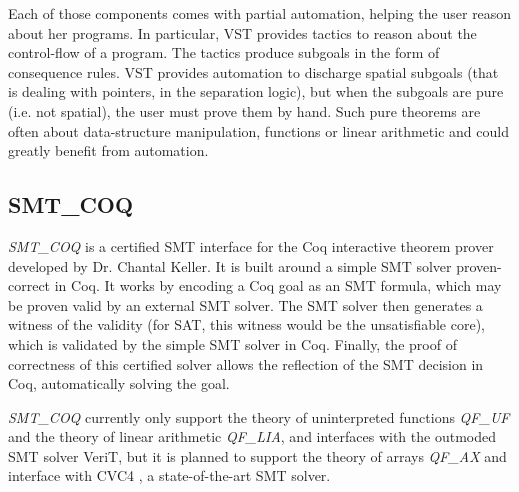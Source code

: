 \documentclass[onecolumn, preprint]{sigplanconf}
\begin{document}
Each of those components comes with partial automation, helping the user reason about her programs. In particular, VST provides tactics to reason about the control-flow of a program. The tactics produce subgoals in the form of consequence rules. VST provides automation to discharge spatial subgoals (that is dealing with pointers, in the separation logic), but when the subgoals are pure (i.e. not spatial), the user must prove them by hand. Such pure theorems are often about data-structure manipulation, functions or linear arithmetic and could greatly benefit from automation.

\subsection{SMT\_COQ}
\emph{SMT\_COQ} is a certified SMT interface for the Coq interactive theorem prover developed by Dr. Chantal Keller. It is built around a simple SMT solver proven-correct in Coq.
It works by encoding a Coq goal as an SMT formula, which may be proven valid by an external SMT solver. The SMT solver then generates a witness of the validity (for SAT, this witness would be the unsatisfiable core), which is validated by the simple SMT solver in Coq. Finally, the proof of correctness of this certified solver allows the reflection of the SMT decision in Coq, automatically solving the goal.

\emph{SMT\_COQ} currently only support the theory of uninterpreted functions \emph{QF\_UF} and the theory of linear arithmetic \emph{QF\_LIA}, and interfaces with the outmoded SMT solver VeriT, but it is planned to support the theory of arrays \emph{QF\_AX} and interface with CVC4 \citep{CVC4}, a state-of-the-art SMT solver.

\end{document}
